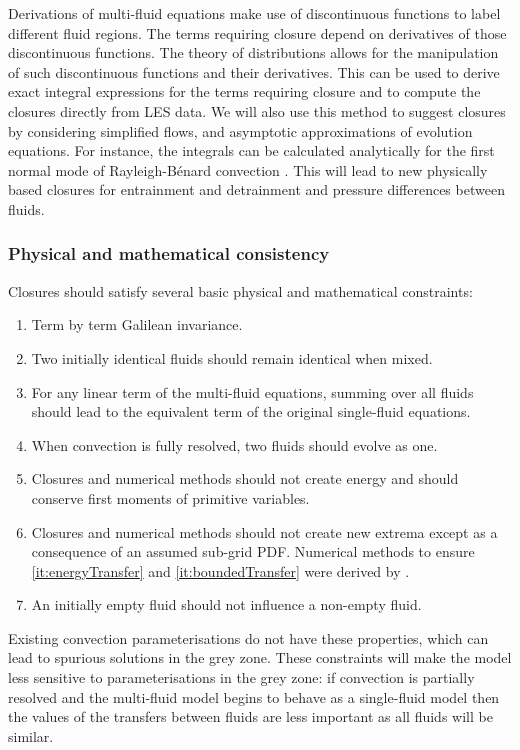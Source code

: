 \documentclass[11pt,a4paper]{article}
\begin{document}
Derivations of multi-fluid equations make use of discontinuous functions to label different fluid regions. The terms requiring closure depend on derivatives of those discontinuous functions. The theory of distributions \cite[]{Schw08} allows for the manipulation of such discontinuous functions and their derivatives. This can be used to derive exact integral expressions for the terms requiring closure and to compute the closures directly from LES data. We will also use this method to suggest closures by considering simplified flows, and asymptotic approximations of evolution equations. For instance, the integrals can be calculated analytically for the first normal mode of Rayleigh-B\'{e}nard convection  \cite[]{SWCM2x}. This will lead to new physically based closures for  entrainment and detrainment  and pressure differences between fluids. 

\subsubsection*{Physical and mathematical consistency}

Closures should satisfy several basic physical and mathematical constraints:
\begin{enumerate}
\item Term by term Galilean invariance.
\item Two initially identical fluids should remain identical when mixed.
\item For any linear term of the multi-fluid equations, summing over all fluids should lead to the equivalent term of the original single-fluid equations.
\item  When convection is fully resolved, two fluids should evolve as one.
\item\label{it:energyTransfer} Closures and numerical methods should not create energy and should conserve first moments of primitive variables.
\item\label{it:boundedTransfer} Closures and numerical methods should not create new extrema except as a consequence of an assumed sub-grid PDF. Numerical methods to ensure \ref{it:energyTransfer} and \ref{it:boundedTransfer} were derived by \cite{MWH20}.
\item An initially empty fluid should not influence a non-empty fluid.
\end{enumerate}
Existing convection parameterisations do not have these properties, which can lead to spurious solutions in the grey zone. These constraints will make the model less sensitive to parameterisations in the grey zone: if convection is partially resolved and the multi-fluid model begins to behave as a single-fluid model then the values of the transfers between fluids are less important as all fluids will be similar.
\end{document}
